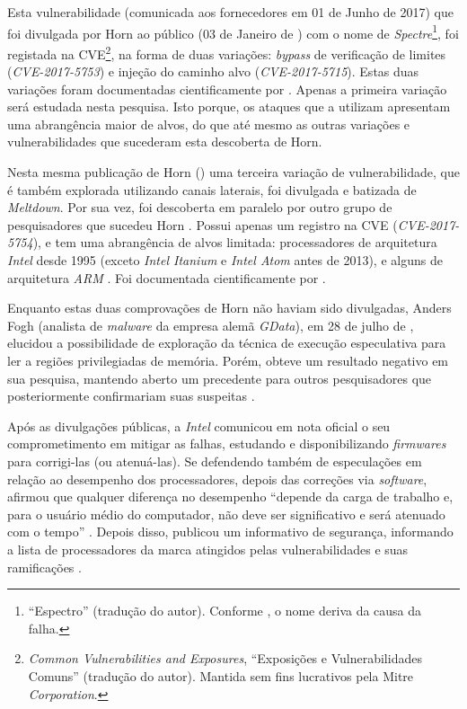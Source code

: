 \documentclass[
	article,			    %
	12pt,				    %
	oneside,			    %
	a4paper,			    %
	chapter=TITLE,		    %
	section=TITLE,		    %
	subsection=TITLE,	    %
	english,			    %
	brazil,				    %
	sumario=tradicional
]{abntex2}
\begin{document}
Esta vulnerabilidade (comunicada aos fornecedores em 01 de Junho de 2017) que foi divulgada por Horn ao público (03 de Janeiro de \citeyear{Jann2018Reading}) com o nome de \emph{Spectre}\footnote{``Espectro'' (tradução do autor). Conforme , o nome deriva da causa da falha.}, foi registada na CVE\footnote{\emph{Common Vulnerabilities and Exposures}, ``Exposições e Vulnerabilidades Comuns'' (tradução do autor). Mantida sem fins lucrativos pela Mitre \emph{Corporation}.}, na forma de duas variações: \emph{bypass} de verificação de limites (\emph{CVE-2017-5753}) e injeção do caminho alvo (\emph{CVE-2017-5715}). Estas duas variações foram documentadas cientificamente por . Apenas a primeira variação será estudada nesta pesquisa. Isto porque, os ataques que a utilizam apresentam uma abrangência maior de alvos, do que até mesmo as outras variações e vulnerabilidades que sucederam esta descoberta de Horn.

Nesta mesma publicação de Horn (\citeyear{Jann2018Reading}) uma terceira variação de vulnerabilidade, que é também explorada utilizando canais laterais, foi divulgada e batizada de \emph{Meltdown}. Por sua vez, foi descoberta em paralelo por outro grupo de pesquisadores que sucedeu Horn \cite{Graz2018Meltdown}. Possui apenas um registro na CVE (\emph{CVE-2017-5754}), e tem uma abrangência de alvos limitada: processadores de arquitetura \emph{Intel} desde 1995 (exceto \emph{Intel Itanium} e \emph{Intel Atom} antes de 2013), e alguns de arquitetura \emph{ARM} \cite{Graz2018Meltdown}. Foi documentada cientificamente por .

Enquanto estas duas comprovações de Horn não haviam sido divulgadas, Anders Fogh (analista de \emph{malware} da empresa alemã \emph{GData}), em 28 de julho de \citeyear{Anders2017Reading}, elucidou a possibilidade de exploração da técnica de execução especulativa para ler a regiões privilegiadas de memória. Porém, obteve um resultado negativo em sua pesquisa, mantendo aberto um precedente para outros pesquisadores que posteriormente confirmariam suas suspeitas \cite{Andy2018Triple}.

Após as divulgações públicas, a \emph{Intel} comunicou em nota oficial o seu comprometimento em mitigar as falhas, estudando e disponibilizando \emph{firmwares} para corrigi-las (ou atenuá-las). Se defendendo também de especulações em relação ao desempenho dos processadores, depois das correções via \emph{software}, afirmou que qualquer diferença no desempenho ``depende da carga de trabalho e, para o usuário médio do computador, não deve ser significativo e será atenuado com o tempo'' \cite{Intel2018NewsIssues}. Depois disso, publicou um informativo de segurança, informando a lista de processadores da marca atingidos pelas vulnerabilidades e suas ramificações \cite{Intel2018SA00088}.
\end{document}
